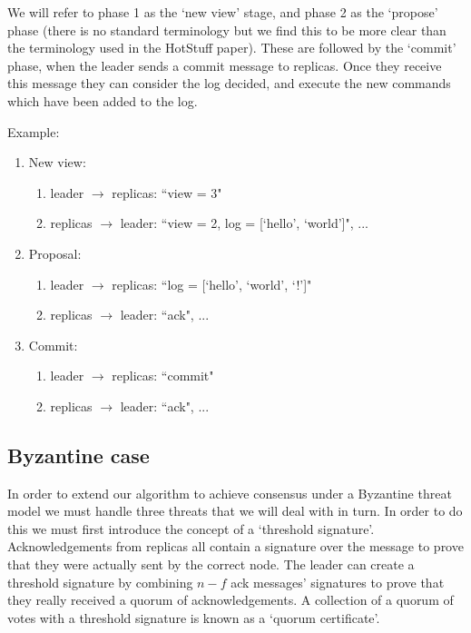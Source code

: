 We will refer to phase 1 as the `new view' stage, and phase 2 as the `propose' phase (there is no standard terminology but we find this to be more clear than the terminology used in the HotStuff paper). These are followed by the `commit' phase, when the leader sends a commit message to replicas. Once they receive this message they can consider the log decided, and execute the new commands which have been added to the log.

Example:

\begin{enumerate}
\item New view: 
	\begin{enumerate}
	\item leader $\to$ replicas: ``view = 3" 
	\item replicas $\to$ leader: ``view = 2, log = [`hello', `world']", ...
	\end{enumerate}
\item Proposal:
	\begin{enumerate}
	\item leader $\to$ replicas: ``log = [`hello', `world', `!']"
	\item replicas $\to$ leader: ``ack", ...
	\end{enumerate}
\item Commit:
	\begin{enumerate}
	\item leader $\to$ replicas: ``commit"
	\item replicas $\to$ leader: ``ack", ...
	\end{enumerate}
\end{enumerate}

\subsection{Byzantine case}
In order to extend our algorithm to achieve consensus under a Byzantine threat model we must handle three threats that we will deal with in turn. In order to do this we must first introduce the concept of a `threshold signature'. Acknowledgements from replicas all contain a signature over the message to prove that they were actually sent by the correct node. The leader can create a threshold signature by combining $n - f $ ack messages' signatures to prove that they really received a quorum of acknowledgements. A collection of a quorum of votes with a threshold signature is known as a `quorum certificate'.

